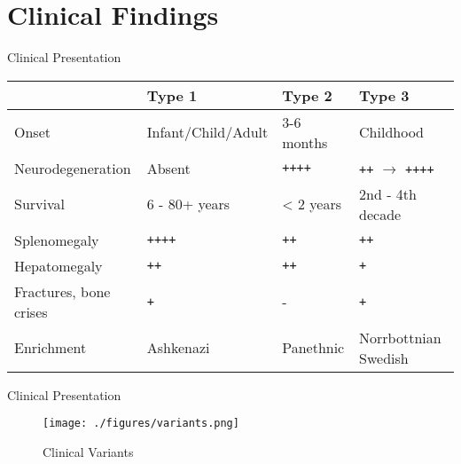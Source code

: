 \documentclass[presentation, smaller]{beamer}
\begin{document}
\section{Clinical Findings}
\label{sec:orgheadline14}
\begin{frame}[fragile,label={sec:orgheadline8}]{Clinical Presentation}
 \begin{center}
\begin{tabular}{llll}
 & Type 1 & Type 2 & Type 3\\
\hline
Onset & Infant/Child/Adult & 3-6 months & Childhood\\
Neurodegeneration & Absent & \texttt{++++} & \texttt{++} \(\to\) \texttt{++++}\\
Survival & 6 - 80+ years & < 2 years & 2nd - 4th decade\\
Splenomegaly & \texttt{++++} & \texttt{++} & \texttt{++}\\
Hepatomegaly & \texttt{++} & \texttt{++} & \texttt{+}\\
Fractures, bone crises & \texttt{+} & - & \texttt{+}\\
Enrichment & Ashkenazi & Panethnic & Norrbottnian Swedish\\
\end{tabular}
\end{center}
\end{frame}



\begin{frame}[label={sec:orgheadline9}]{Clinical Presentation}
\begin{figure}[htb]
\centering
\texttt{[image: ./figures/variants.png]}
\caption[variants]{\label{tab:variants}
Clinical Variants}
\end{figure}
\end{frame}
\end{document}
